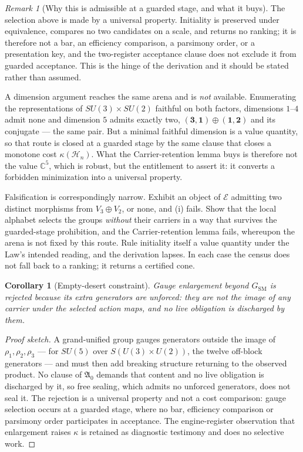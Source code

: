 \documentclass[11pt]{article}
\theoremstyle{plain}
\newtheorem{corollary}[theorem]{Corollary}
\theoremstyle{definition}
\theoremstyle{remark}
\newtheorem{remark}[theorem]{Remark}
\newenvironment{proofsketch}{\begin{proof}[Proof sketch]}{\end{proof}}
\newcommand{\C}{\mathbb{C}}
\begin{document}
\begin{remark}[Why this is admissible at a guarded stage, and what it buys]
The selection above is made by a universal property.  Initiality is preserved
under equivalence, compares no two candidates on a scale, and returns no
ranking; it is therefore not a bar, an efficiency comparison, a parsimony order,
or a presentation key, and the two-register acceptance clause does not exclude
it from guarded acceptance.  This is the hinge of the derivation and it should
be stated rather than assumed.

A dimension argument reaches the same arena and is \emph{not} available.
Enumerating the representations of \(SU(3)\times SU(2)\) faithful on both
factors, dimensions \(1\)--\(4\) admit none and dimension \(5\) admits exactly
two, \((\mathbf3,\mathbf1)\oplus(\mathbf1,\mathbf2)\) and its conjugate --- the
same pair.  But a minimal faithful dimension is a value quantity, so that route
is closed at a guarded stage by the same clause that closes a monotone cost
\(\kappa(\mathcal H_n)\).  What the Carrier-retention lemma buys is therefore
not the value \(\C^5\), which is robust, but the entitlement to assert it: it
converts a forbidden minimization into a universal property.

Falsification is correspondingly narrow.  Exhibit an object of \(\mathcal E\)
admitting two distinct morphisms from \(V_3\oplus V_2\), or none, and (i) fails.
Show that the local alphabet selects the groups \emph{without} their carriers in
a way that survives the guarded-stage prohibition, and the Carrier-retention
lemma fails, whereupon the arena is not fixed by this route.  Rule initiality
itself a value quantity under the Law's intended reading, and the derivation
lapses.  In each case the census does not fall back to a ranking; it returns a
certified cone.
\end{remark}

\begin{corollary}[Empty-desert constraint]
Gauge enlargement beyond \(G_{\mathrm{SM}}\) is rejected because its extra generators are unforced: they are not the image of any carrier under the selected action maps, and no live obligation is discharged by them.
\end{corollary}

\begin{proofsketch}
A grand-unified group gauges generators outside the image of \(\rho_1,\rho_2,\rho_3\) --- for \(SU(5)\) over \(S(U(3)\times U(2))\), the twelve off-block generators --- and must then add breaking structure returning to the observed product. No clause of \(\mathfrak A_0\) demands that content and no live obligation is discharged by it, so free sealing, which admits no unforced generators, does not seal it. The rejection is a universal property and not a cost comparison: gauge selection occurs at a guarded stage, where no bar, efficiency comparison or parsimony order participates in acceptance. The engine-register observation that enlargement raises \(\kappa\) is retained as diagnostic testimony and does no selective work.
\end{proofsketch}
\end{document}
